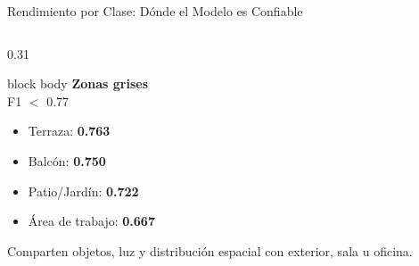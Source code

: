 \documentclass[aspectratio=169]{beamer}
\begin{document}
\begin{frame}{Rendimiento por Clase: D\'onde el Modelo es Confiable}
\begin{columns}[T,totalwidth=\textwidth]
\begin{column}{0.31\textwidth}
\begin{beamercolorbox}[rounded=true,sep=0.12cm,wd=\linewidth]{block body}
\centering
\textbf{Zonas grises}\\[-1pt]
\scriptsize F1 $<$ 0.77
\end{beamercolorbox}
\vspace{0.08cm}
\begin{itemize}
\item Terraza: \textbf{0.763}
\item Balc\'on: \textbf{0.750}
\item Patio/Jard\'in: \textbf{0.722}
\item \'Area de trabajo: \textbf{0.667}
\end{itemize}
\vspace{0.05cm}
{\scriptsize Comparten objetos, luz y distribuci\'on espacial con exterior, sala u oficina.}
\end{column}
\end{columns}

\end{frame}
\end{document}
